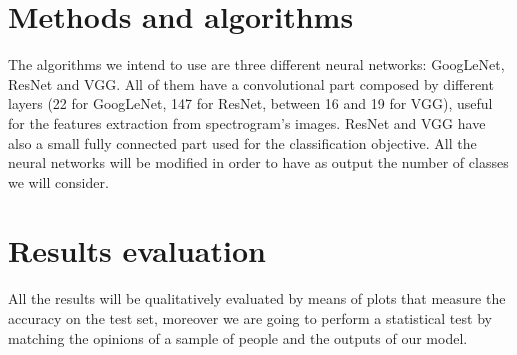 \documentclass{paper}
\begin{document}
\section{Methods and algorithms}

The algorithms we intend to use are three different neural networks: GoogLeNet, ResNet and VGG.
All of them have a convolutional part composed by different layers (22 for GoogLeNet, 147 for ResNet, between 16 and 19 for VGG), useful for the features extraction from spectrogram's images.
ResNet and VGG have also a small fully connected part used for the classification objective. 
All the neural networks will be modified in order to have as output the number of classes we will consider.

\section{Results evaluation}

All the results will be qualitatively evaluated by means of plots that measure the accuracy on the test set, moreover we are going to perform a statistical test by matching the opinions of a sample of people and the outputs of our model. 
\end{document}
